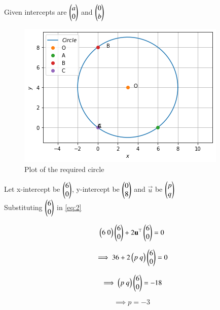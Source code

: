 \documentclass[journal,12pt,twocolumn]{IEEEtran}
\begin{document}
Given intercepts are $\begin{pmatrix}a\\0\end{pmatrix}$ and $\begin{pmatrix}0\\b\end{pmatrix}$
\\
\begin{figure}[!h]
         \centering
         \includegraphics[width=\columnwidth]{figure3.png}
         \caption{Plot of the required circle}
         \label{Figure}
\end{figure}
Let x-intercept be $\begin{pmatrix}6\\0\end{pmatrix}$, y-intercept be $\begin{pmatrix}0\\8\end{pmatrix}$ and 
$\vec{u}$ be $\begin{pmatrix}p\\q\end{pmatrix}$
\\
Substituting $\begin{pmatrix}6\\0\end{pmatrix}$ in \ref{eq:2}

\begin{equation}
    \myvec{6\ 0}\myvec{6\\0}+2\vec{u^\top}\myvec{6\\0}=0
\end{equation}

\begin{equation}
\implies 36+2\myvec{p \ q}\myvec{6\\0}=0
\end{equation}

\begin{equation}
    \implies \myvec{p \ q}\myvec{6\\0}=-18
\end{equation}

\begin{equation}
\implies p=-3
\end{equation}
\end{document}
